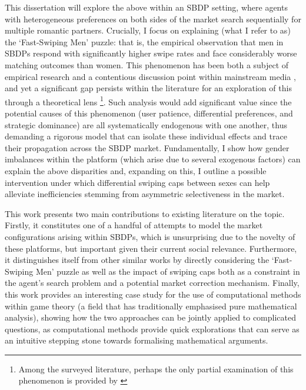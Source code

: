 This dissertation will explore the above within an SBDP setting, where agents with heterogeneous preferences on both sides of the market search sequentially for multiple romantic partners.
Crucially, I focus on explaining (what I refer to as) the `Fast-Swiping Men' puzzle: that is, the empirical observation that men in SBDPs respond with significantly higher swipe rates and face considerably worse matching outcomes than women. This phenomenon has been both a subject of empirical research \citep{tyson2016first} and a contentious discussion point within mainstream media \citep{web:vice_tindermen, web:wp_miserabletinder}, and yet a significant gap persists within the literature for an exploration of this through a theoretical lens \footnote{Among the surveyed literature, perhaps the only partial examination of this phenomenon is provided by \cite{kanoria2021facilitating}}. 
Such analysis would add significant value since the potential causes of this phenomenon (user patience, differential preferences, and strategic dominance) are all systematically endogenous with one another, thus demanding a rigorous model that can isolate these individual effects and trace their propagation across the SBDP market.
Fundamentally, I show how gender imbalances within the platform (which arise due to several exogenous factors) can explain the above disparities and, expanding on this, I outline a possible intervention under which differential swiping caps between sexes can help alleviate inefficiencies stemming from asymmetric selectiveness in the market.

This work presents two main contributions to existing literature on the topic. 
Firstly, it constitutes one of a handful of attempts to model the market configurations arising within SBDPs, which is unsurprising due to the novelty of these platforms, but important given their current social relevance. 
Furthermore, it distinguishes itself from other similar works by directly considering the `Fast-Swiping Men' puzzle as well as the impact of swiping caps both as a constraint in the agent's search problem and a potential market correction mechanism.
Finally, this work provides an interesting case study for the use of computational methods within game theory (a field that has traditionally emphasised pure mathematical analysis), showing how the two approaches can be jointly applied to complicated questions, as computational methods provide quick explorations that can serve as an intuitive stepping stone towards formalising mathematical arguments.

